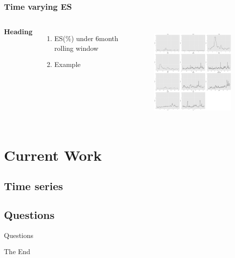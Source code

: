 \documentclass{beamer}
\newcommand\Fontviii{\fontsize{8}{9.2}\selectfont}
\begin{document}
\begin{frame}
\frametitle{Time varying ES}
\Fontviii
\begin{columns}[c] %

\textbf{Heading}
\begin{enumerate}
\item ES(\%) under 6\-month rolling window
\item Example
\end{enumerate}

\begin{figure}[h]
\centering 
\includegraphics[width=6.5cm]{../results/ES6mon_scaled}
\label{fig: ES6mon}
\end{figure}
\end{columns}
\end{frame}

\section{Current Work}
\subsection{Time series}

\begin{frame}
\frametitle{}

\end{frame}

\subsection{Questions}

\begin{frame}
\Huge{\centerline{Questions}}
\end{frame}


\begin{frame}
\Huge{\centerline{The End}}
\end{frame}

\end{document}
